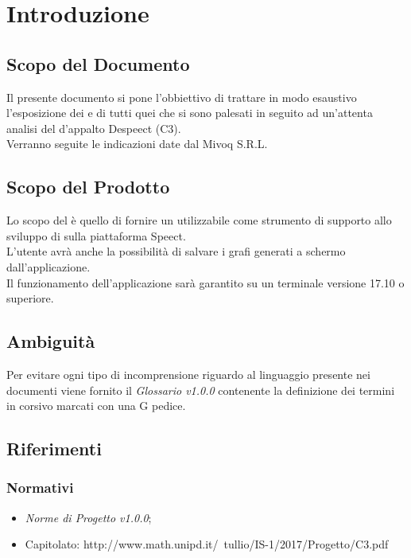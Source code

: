 \documentclass[./AnalisideiRequisiti.tex]{subfiles}
\begin{document}
	
\chapter{Introduzione}
\section{Scopo del Documento}
Il presente documento si pone l’obbiettivo di trattare in modo esaustivo l’esposizione dei  e di tutti quei  che si sono palesati in seguito ad un’attenta analisi del  d’appalto Despeect (C3).
\\ \noindent Verranno seguite le indicazioni date dal  Mivoq S.R.L.

\section{Scopo del Prodotto}

Lo scopo del  è quello di fornire un  utilizzabile come strumento di supporto allo sviluppo di  sulla piattaforma Speect. 
\\ \noindent L'utente avrà anche la possibilità di salvare i grafi generati a schermo dall'applicazione.
\\ \noindent Il funzionamento dell'applicazione sarà garantito su un terminale  versione 17.10 o superiore.

\section{Ambiguità}
Per evitare ogni tipo di incomprensione riguardo al linguaggio presente nei documenti viene fornito il \textit{Glossario v1.0.0} contenente la definizione dei termini in corsivo marcati con una G pedice.

\section{Riferimenti}
\subsection{Normativi}
\begin{itemize}
	\item \textit{Norme di Progetto v1.0.0};
	\item Capitolato: http://www.math.unipd.it/~tullio/IS-1/2017/Progetto/C3.pdf
\end{itemize}
\end{document}
